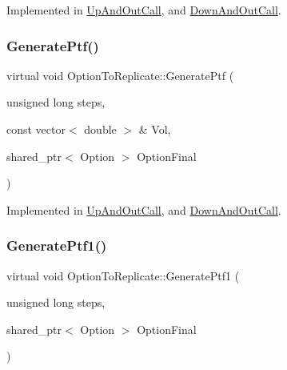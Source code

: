 Implemented in \hyperlink{classUpAndOutCall_aed1268fa0b2bd83e9191385560bb7910}{Up\+And\+Out\+Call}, and \hyperlink{classDownAndOutCall_a378b557d728ed157db9d41ef39bb8abf}{Down\+And\+Out\+Call}.

\hypertarget{classOptionToReplicate_a47ad183412648a70cd77957383eb421f}{}\label{classOptionToReplicate_a47ad183412648a70cd77957383eb421f} 
\subsubsection{\texorpdfstring{Generate\+Ptf()}{GeneratePtf()}\hspace{0.1cm}{\footnotesize\ttfamily [2/2]}}
{\footnotesize\ttfamily virtual void Option\+To\+Replicate\+::\+Generate\+Ptf (\begin{DoxyParamCaption}\item[{unsigned long}]{steps,  }\item[{const vector$<$ double $>$ \&}]{Vol,  }\item[{shared\+\_\+ptr$<$ Option $>$}]{Option\+Final }\end{DoxyParamCaption})\hspace{0.3cm}{\ttfamily [pure virtual]}}



Implemented in \hyperlink{classUpAndOutCall_a3afb135f946b6c42226c15a36a0b1971}{Up\+And\+Out\+Call}, and \hyperlink{classDownAndOutCall_a7f4f73437c1e61cc57f96fadd05a7df1}{Down\+And\+Out\+Call}.

\hypertarget{classOptionToReplicate_ad3315e5766faa9be46fa690d8d358b9d}{}\label{classOptionToReplicate_ad3315e5766faa9be46fa690d8d358b9d} 
\subsubsection{\texorpdfstring{Generate\+Ptf1()}{GeneratePtf1()}}
{\footnotesize\ttfamily virtual void Option\+To\+Replicate\+::\+Generate\+Ptf1 (\begin{DoxyParamCaption}\item[{unsigned long}]{steps,  }\item[{shared\+\_\+ptr$<$ Option $>$}]{Option\+Final }\end{DoxyParamCaption})\hspace{0.3cm}{\ttfamily [pure virtual]}}



